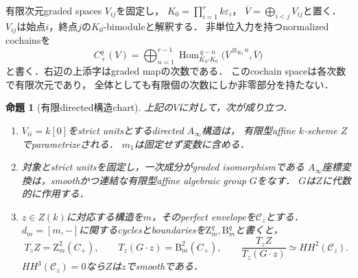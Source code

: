 \documentclass[11pt,a4paper]{ltjsarticle}
\newtheorem{proposition}[theorem]{命題}
\theoremstyle{definition}
\newcommand{\Hom}{\operatorname{Hom}}
\begin{document}
有限次元graded spaces $V_{ij}$を固定し，
$K_0=\prod_{i=1}^rk\varepsilon_i$，
$\overline V=\bigoplus_{i<j}V_{ij}$と置く．
$V_{ij}$は始点$i$，終点$j$の$K_0$-bimoduleと解釈する．
非単位入力を持つnormalized cochainsを
\begin{equation}\label{eq:finite-directed-cochains}
 C_+^q(V)=
 \bigoplus_{n=1}^{r-1}
 \Hom_{K_0\text{-}K_0}^{\,q-n}
       \bigl(\overline V^{\otimes_{K_0}n},\overline V\bigr)
\end{equation}
と書く．右辺の上添字はgraded mapの次数である．
このcochain spaceは各次数で有限次元であり，
全体としても有限個の次数にしか非零部分を持たない．

\begin{proposition}[有限directed構造chart]
\label{prop:finite-directed-chart}
上記の$V$に対して，次が成り立つ．
\begin{enumerate}
\item
$V_{ii}=k[0]$をstrict unitsとするdirected $A_\infty$構造は，
有限型affine $k$-scheme $Z$でparametrizeされる．
$m_1$は固定せず変数に含める．
\item
対象とstrict unitsを固定し，一次成分がgraded isomorphismである
$A_\infty$座標変換は，smoothかつ連結な有限型affine algebraic group $G$をなす．
$G$は$Z$に代数的に作用する．
\item
$z\in Z(k)$に対応する構造を$m$，そのperfect envelopeを$\mathcal C_z$とする．
$d_m=[m,-]$に関するcyclesとboundariesを$\mathrm Z_m^q,\mathrm B_m^q$と書くと，
\[
 T_zZ=\mathrm Z_m^2(C_+),\qquad
 T_z(G\cdot z)=\mathrm B_m^2(C_+),\qquad
 \frac{T_zZ}{T_z(G\cdot z)}
       \simeq HH^2(\mathcal C_z).
\]
$HH^3(\mathcal C_z)=0$なら$Z$は$z$でsmoothである．
\end{enumerate}
\end{proposition}
\end{document}
